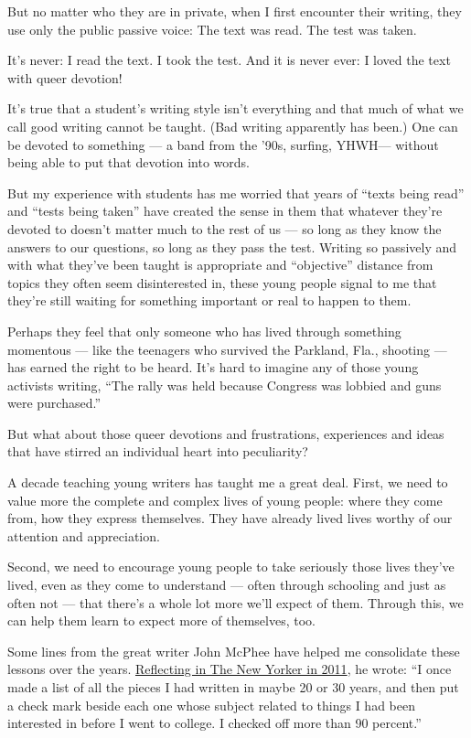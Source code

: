 But no matter who they are in private, when I first encounter their
writing, they use only the public passive voice: The text was read. The
test was taken.

It's never: I read the text. I took the test. And it is never ever: I
loved the text with queer devotion!

It's true that a student's writing style isn't everything and that much
of what we call good writing cannot be taught. (Bad writing apparently
has been.) One can be devoted to something --- a band from the '90s,
surfing, YHWH--- without being able to put that devotion into words.

But my experience with students has me worried that years of ``texts
being read'' and ``tests being taken'' have created the sense in them
that whatever they're devoted to doesn't matter much to the rest of us
--- so long as they know the answers to our questions, so long as they
pass the test. Writing so passively and with what they've been taught is
appropriate and ``objective'' distance from topics they often seem
disinterested in, these young people signal to me that they're still
waiting for something important or real to happen to them.

Perhaps they feel that only someone who has lived through something
momentous --- like the teenagers who survived the Parkland, Fla.,
shooting --- has earned the right to be heard. It's hard to imagine any
of those young activists writing, ``The rally was held because Congress
was lobbied and guns were purchased.''

But what about those queer devotions and frustrations, experiences and
ideas that have stirred an individual heart into peculiarity?

A decade teaching young writers has taught me a great deal. First, we
need to value more the complete and complex lives of young people: where
they come from, how they express themselves. They have already lived
lives worthy of our attention and appreciation.

Second, we need to encourage young people to take seriously those lives
they've lived, even as they come to understand --- often through
schooling and just as often not --- that there's a whole lot more we'll
expect of them. Through this, we can help them learn to expect more of
themselves, too.

Some lines from the great writer John McPhee have helped me consolidate
these lessons over the years.
\href{https://www.newyorker.com/magazine/2011/11/14/progression}{Reflecting
in The New Yorker in 2011}, he wrote: ``I once made a list of all the
pieces I had written in maybe 20 or 30 years, and then put a check mark
beside each one whose subject related to things I had been interested in
before I went to college. I checked off more than 90 percent.''

